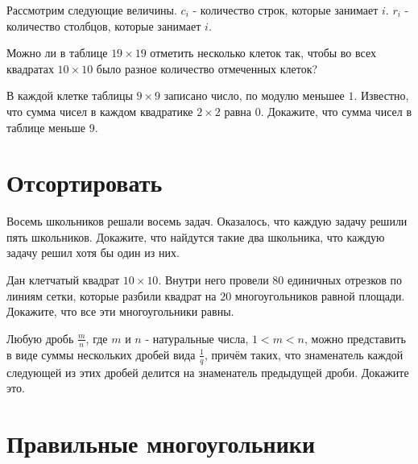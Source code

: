 \documentclass[12pt]{book}
\begin{document}
\begin{solution}
Рассмотрим следующие величины. $c_{i}$ - количество строк, которые занимает $i$. $r_{i}$ - количество столбцов, которые занимает $i$. 
\end{solution}

\begin{task} Можно ли в таблице $19 \times 19$ отметить несколько клеток так, чтобы во всех квадратах $10 \times 10$ было разное количество отмеченных клеток?
\end{task}

\begin{task} В каждой клетке таблицы $9 \times 9$ записано число, по модулю меньшее $1$. Известно, что сумма чисел в каждом квадратике $2 \times 2$ равна $0$. Докажите, что сумма чисел в таблице меньше $9$. 
\end{task}


\section*{Отсортировать}

\begin{task}
Восемь школьников решали восемь задач. Оказалось, что каждую задачу решили пять школьников. Докажите, что найдутся такие два школьника, что каждую задачу решил хотя бы один из них. 
\end{task}

\begin{solution}

\end{solution}

\begin{task}
Дан клетчатый квадрат $10 \times 10$. Внутри него провели $80$ единичных отрезков по линиям сетки, которые разбили квадрат на $20$ многоугольников равной площади. Докажите, что все эти многоугольники равны.
\end{task}

\begin{task}
Любую дробь $\frac{m}{n}$, где $m$ и $n$ - натуральные числа, $1 < m < n$, можно представить в виде суммы нескольких дробей вида $\frac{1}{q}$, причём таких, что знаменатель каждой следующей из этих дробей делится на знаменатель предыдущей дроби. Докажите это.
\end{task}

\section*{Правильные многоугольники}
\end{document}
